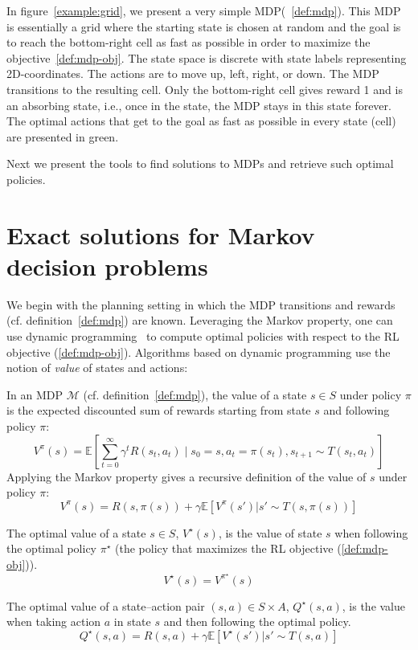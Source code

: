 In figure~\ref{example:grid}, we present a very simple MDP(~\ref{def:mdp}).
This MDP is essentially a grid where the starting state is chosen at random and the goal is to reach the bottom-right cell as fast as possible in order to maximize the objective~\ref{def:mdp-obj}.
The state space is discrete with state labels representing 2D-coordinates.
The actions are to move up, left, right, or down. The MDP transitions to the resulting cell. 
Only the bottom-right cell gives reward 1 and is an absorbing state, i.e., once in the state, the MDP stays in this state forever.
The optimal actions that get to the goal as fast as possible in every state (cell) are presented in green.

Next we present the tools to find solutions to MDPs and retrieve such optimal policies.

\section{Exact solutions for Markov decision problems}\label{sec:values}
We begin with the planning setting in which the MDP transitions and rewards (cf. definition~\ref{def:mdp}) are known. 
Leveraging the Markov property, one can use dynamic programming~\cite{Bellman} to compute optimal policies with respect to the RL objective (\ref{def:mdp-obj}).
Algorithms based on dynamic programming use the notion of \textit{value} of states and actions:
\begin{definition}\label{def:vs} 
    In an MDP $\mathcal{M}$ (cf. definition~\ref{def:mdp}), the value of a state $s\in S$ under policy $\pi$ is the expected discounted sum of rewards starting from state $s$ and following policy $\pi$:
    $$V^\pi(s) = \mathbb{E}\left[\sum_{t=0}^{\infty} \gamma^t R(s_t, a_t) \mid s_0 = s, a_t = \pi(s_t), s_{t+1} \sim T(s_t, a_t)\right]$$
    Applying the Markov property gives a recursive definition of the value of $s$ under policy $\pi$:
    $$V^\pi(s) = R(s,\pi(s)) + \gamma \mathbb{E}\left[V^\pi(s') | s'\sim T(s, \pi(s))\right]$$
\end{definition}
\begin{definition} The optimal value of a state $s\in S$, $V^\star(s)$, is the value of state $s$ when following the optimal policy $\pi^{\star}$ (the policy that maximizes the RL objective (\ref{def:mdp-obj})).
    $$V^{\star}(s) = V^{\pi^{\star}}(s)$$
\end{definition}
\begin{definition}\label{def:qvalues} The optimal value of a state–action pair $(s,a)\in S\times A$, $Q^\star(s,a)$, is the value when taking action $a$ in state $s$ and then following the optimal policy.
    $$Q^{\star}(s,a) = R(s, a) + \gamma\mathbb{E}\left[V^{\star}(s') | s'\sim T(s, a)\right]$$
\end{definition}

